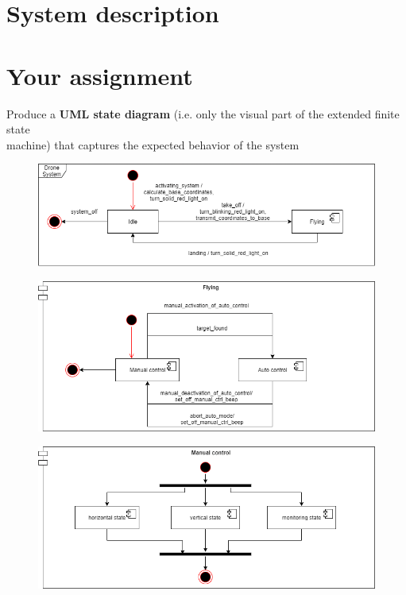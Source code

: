 \documentclass[12pt]{article}
\begin{document}
\section{System description}


\section{Your assignment}
\noindent Produce a \textbf{UML state diagram} (i.e. only the visual part of the extended finite state\\
machine) that captures the expected behavior of the system

\begin{figure}[ht]
\includegraphics[width=\textwidth,keepaspectratio]{1-DroneSys.png}
\end{figure}

\begin{figure}[ht]
\includegraphics[width=\textwidth,height=\textheight,keepaspectratio]{2-Flying.png}
\end{figure}


\begin{figure}[ht]
\includegraphics[width=\textwidth,keepaspectratio]{3-ManualControl.png}
\end{figure}
\end{document}
